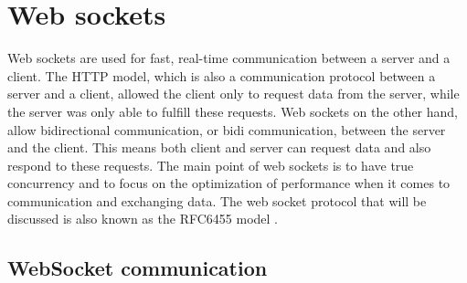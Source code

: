 \documentclass[a4paper, 11pt]{report}
\begin{document}
\section{Web sockets}
Web sockets are used for fast, real-time communication between a server and a client. The HTTP model, which is also a communication protocol between a server and a client, allowed the client only to request data from the server, while the server was only able to fulfill these requests. Web sockets on the other hand, allow bidirectional communication, or bidi communication, between the server and the client. This means both client and server can request data and also respond to these requests. The main point of web sockets is to have true concurrency and to focus on the optimization of performance when it comes to communication and exchanging data. The web socket protocol that will be discussed is also known as the RFC6455 model \cite{RFC6455}.

	\subsection{WebSocket communication}\label{subsec:WebSocketCom}
\end{document}
